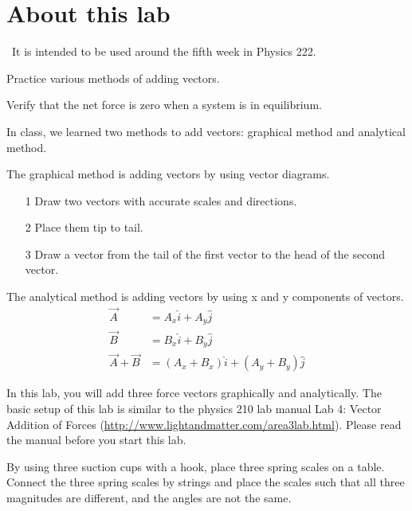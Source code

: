 \renewcommand\thechapter{c1.5a}
\label{lab:covid-vector-addition}


\section*{About this lab}

\covid\ 
It is intended to be used around the fifth week in Physics 222.

\apparatus
{}

\begin{goals}

\item[] Practice various methods of adding vectors.

\item[] Verify that the net force is zero when a system is in equilibrium. 

\end{goals}

\introduction
In class, we learned two methods to add vectors: graphical method and analytical method. 

The graphical method is adding vectors by using vector diagrams. 
\begin{itemize}
\item[1]Draw two vectors with accurate scales and directions. 
\item[2]Place them tip to tail. 
\item[3]Draw a vector from the tail of the first vector to the head of the second vector.   
\end{itemize}


The analytical method is adding vectors by using x and y components of vectors.
\begin{align*}
\vec{A} &= A_x \hat{i}+A_y \hat{j} \\
\vec{B} &= B_x \hat{i}+B_y \hat{j} \\
\vec{A} +\vec{B} &= (A_x+B_x) \hat{i}+(A_y+B_y) \hat{j}
\end{align*}

In this lab, you will add three force vectors graphically and analytically. 
\observations 
The basic setup of this lab is similar to the physics 210 lab manual Lab 4: Vector Addition of Forces (\url{http://www.lightandmatter.com/area3lab.html}). Please read the manual before you start this lab. 

By using three suction cups with a hook, place three spring scales on a table. Connect the three spring scales by strings and place the scales such that all three magnitudes are different, and the angles are not the same. 

